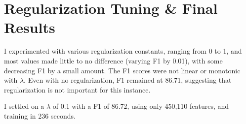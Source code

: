 \documentclass[11pt]{article}
\begin{document}
\section{Regularization Tuning & Final Results}

I experimented with various regularization constants, ranging from 0 to 1, and most values
made little to no difference (varying F1 by 0.01), with some decreasing F1 by a small amount. 
The F1 scores were not linear or monotonic with $\lambda$. 
Even with no regularization, F1 remained at 86.71, suggesting that regularization is not important
for this instance.

I settled on a $\lambda$ of 0.1 with a F1 of 86.72, using only 450,110 features, and training in
236 seconds.
\end{document}
